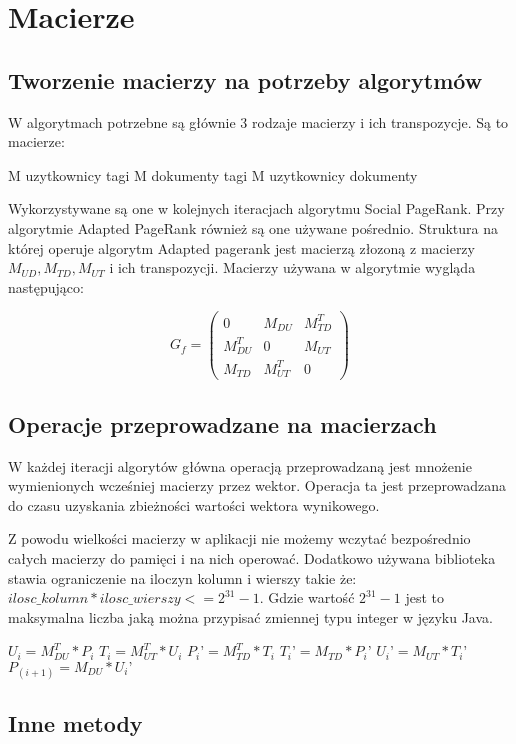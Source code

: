\documentclass[11pt,a4paper]{report}
\begin{document}
\tableofcontents
\listoflistings
\chapter{Macierze}
\section{Tworzenie macierzy na potrzeby algorytmów}
W algorytmach potrzebne są głównie 3 rodzaje macierzy i ich transpozycje. Są to macierze:

M uzytkownicy tagi
M dokumenty tagi
M uzytkownicy dokumenty

Wykorzystywane są one w kolejnych iteracjach algorytmu Social PageRank. Przy algorytmie Adapted PageRank również są one używane pośrednio. Struktura na której operuje algorytm Adapted pagerank jest macierzą złozoną z macierzy $M_{UD} , M_{TD}, M_{UT}$ i ich transpozycji. Macierzy używana w algorytmie wygląda następująco:

\[
 G_f =
 \begin{pmatrix}
  0                     & M_{DU}       & M_{TD}^T \\
  M_{DU}^T  & 0                     & M_{UT}     \\
  M_{TD}       & M_{UT}^T   & 0 
 \end{pmatrix}
\]



\section{Operacje przeprowadzane na macierzach}
W każdej iteracji algorytów główna operacją przeprowadzaną jest mnożenie wymienionych wcześniej macierzy przez wektor. Operacja ta jest przeprowadzana do czasu uzyskania zbieżności wartości wektora wynikowego.

Z powodu wielkości macierzy w aplikacji nie możemy wczytać bezpośrednio całych macierzy do pamięci i na nich operować. Dodatkowo używana biblioteka stawia ograniczenie na iloczyn kolumn i wierszy takie że: $ilosc\_kolumn * ilosc\_wierszy <= 2^{31}-1$.  Gdzie wartość $2^{31}-1$ jest to maksymalna liczba jaką można przypisać zmiennej typu integer w języku Java. 

\begin{algorithmic}
\REPEAT
\STATE $U_i = M_{DU}^T * P_i$
\STATE $T_i = M_{UT}^T * U_i$
\STATE $P_i’ = M_{TD}^T * T_i$
\STATE $T_i’ = M_{TD}  * P_i’$
\STATE $U_i’ = M_{UT} * T_i’$
\STATE $P_(i+1) = M_{DU} * U_i’$
\end{algorithmic}



\section{Inne metody}
\end{document}
